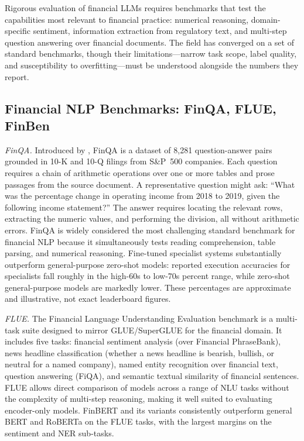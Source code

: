 Rigorous evaluation of financial LLMs requires benchmarks that test the
capabilities most relevant to financial practice: numerical reasoning,
domain-specific sentiment, information extraction from regulatory text, and
multi-step question answering over financial documents.  The field has converged
on a set of standard benchmarks, though their limitations---narrow task scope,
label quality, and susceptibility to overfitting---must be understood alongside
the numbers they report.

\subsection{Financial NLP Benchmarks: FinQA, FLUE, FinBen}
\label{sec:ch08-benchmarks}

\textit{FinQA.}  Introduced by \citet{chen2021finqa}, FinQA is a dataset of
8,281 question-answer pairs grounded in 10-K and 10-Q filings from S\&P~500
companies.  Each question requires a chain of arithmetic operations over one or
more tables and prose passages from the source document.  A representative question
might ask: ``What was the percentage change in operating income from 2018 to 2019,
given the following income statement?''  The answer requires locating the relevant
rows, extracting the numeric values, and performing the division, all without
arithmetic errors.  FinQA is widely considered the most challenging standard
benchmark for financial NLP because it simultaneously tests reading comprehension,
table parsing, and numerical reasoning.  Fine-tuned specialist systems substantially
outperform general-purpose zero-shot models: reported execution accuracies for
specialists fall roughly in the high-60s to low-70s percent range, while zero-shot
general-purpose models are markedly lower. These percentages are approximate and
illustrative, not exact leaderboard figures.

\textit{FLUE.}  The Financial Language Understanding Evaluation benchmark
\cite{shah2022flue} is a multi-task suite designed to mirror GLUE/SuperGLUE for
the financial domain.  It includes five tasks: financial sentiment analysis (over
Financial PhraseBank), news headline classification (whether a news headline is
bearish, bullish, or neutral for a named company), named entity recognition over
financial text, question answering (FiQA), and semantic textual similarity of
financial sentences.  FLUE allows direct comparison of models across a range of
NLU tasks without the complexity of multi-step reasoning, making it well suited
to evaluating encoder-only models.  FinBERT and its variants consistently
outperform general BERT and RoBERTa on the FLUE tasks, with the largest margins
on the sentiment and NER sub-tasks.

